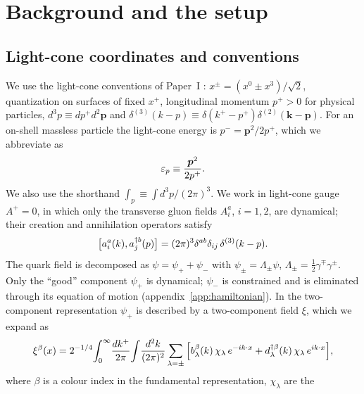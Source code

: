 \section{Background and the setup}
\label{sec:setup}

\subsection{Light-cone coordinates and conventions}
\label{sec:conv}

We use the light-cone conventions of Paper~I \cite{PaperI,Harindranath:1996hq,Burkardt:1995ct}:
$x^{\pm}=(x^{0}\pm x^{3})/\sqrt2$, quantization on surfaces of fixed $x^{+}$, longitudinal momentum
$p^{+}>0$ for physical particles, $d^{3}p\equiv dp^{+}d^{2}\bm p$ and
$\delta^{(3)}(k-p)\equiv\delta(k^{+}-p^{+})\delta^{(2)}(\bm k-\bm p)$. For an on-shell massless
particle the light-cone energy is $p^{-}=\bm p^{2}/2p^{+}$, which we abbreviate as
\begin{equation}
\varepsilon_{p}\equiv\frac{\bm p^{2}}{2p^{+}} .
\label{eq:eps}
\end{equation}
We also use the shorthand $\int_{p}\equiv\int d^{3}p/(2\pi)^{3}$. We work in light-cone gauge
$A^{+}=0$, in which only the transverse gluon fields $A^{a}_{i}$, $i=1,2$, are dynamical; their
creation and annihilation operators satisfy
\begin{equation}
\big[a^{a}_{i}(k),a^{\dagger b}_{j}(p)\big]=(2\pi)^{3}\delta^{ab}\delta_{ij}\,\delta^{(3)}(k-p).
\label{eq:aa}
\end{equation}
The quark field is decomposed as $\psi=\psi_{+}+\psi_{-}$ with $\psi_{\pm}=\Lambda_{\pm}\psi$,
$\Lambda_{\pm}=\tfrac12\gamma^{\mp}\gamma^{\pm}$. Only the ``good'' component $\psi_{+}$ is
dynamical; $\psi_{-}$ is constrained and is eliminated through its equation of motion
(appendix~\ref{app:hamiltonian}). In the two-component representation
\cite{Zhang:1993dd,Brodsky:1997de} $\psi_{+}$ is described by a two-component field $\xi$, which we
expand as
\begin{equation}
\xi^{\beta}(x)=2^{-1/4}\!\int_{0}^{\infty}\!\frac{dk^{+}}{2\pi}\!\int\!\frac{d^{2}k}{(2\pi)^{2}}
\sum_{\lambda=\pm}\Big[b^{\beta}_{\lambda}(k)\,\chi_{\lambda}\,e^{-ik\cdot x}
+d^{\dagger\beta}_{\lambda}(k)\,\chi_{\lambda}\,e^{ik\cdot x}\Big],
\label{eq:xi}
\end{equation}
where $\beta$ is a colour index in the fundamental representation, $\chi_{\lambda}$ are the
